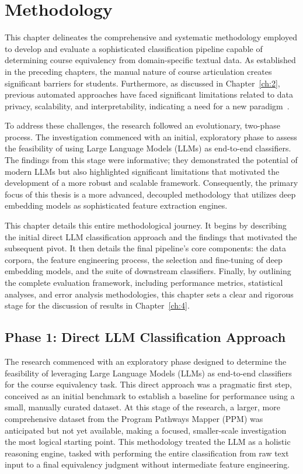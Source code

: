 \chapter{Methodology}\label{ch:3}
This chapter delineates the comprehensive and systematic methodology employed to develop and evaluate a sophisticated classification pipeline capable of determining course equivalency from domain-specific textual data. As established in the preceding chapters, the manual nature of course articulation creates significant barriers for students. Furthermore, as discussed in Chapter~\ref{ch:2}, previous automated approaches have faced significant limitations related to data privacy, scalability, and interpretability, indicating a need for a new paradigm~\cite{pardos-articulation-2019, slade10.1177/0002764213479366}.

To address these challenges, the research followed an evolutionary, two-phase process. The investigation commenced with an initial, exploratory phase to assess the feasibility of using Large Language Models (LLMs) as end-to-end classifiers. The findings from this stage were informative; they demonstrated the potential of modern LLMs but also highlighted significant limitations that motivated the development of a more robust and scalable framework. Consequently, the primary focus of this thesis is a more advanced, decoupled methodology that utilizes deep embedding models as sophisticated feature extraction engines.

This chapter details this entire methodological journey. It begins by describing the initial direct LLM classification approach and the findings that motivated the subsequent pivot. It then details the final pipeline's core components: the data corpora, the feature engineering process, the selection and fine-tuning of deep embedding models, and the suite of downstream classifiers. Finally, by outlining the complete evaluation framework, including performance metrics, statistical analyses, and error analysis methodologies, this chapter sets a clear and rigorous stage for the discussion of results in Chapter~\ref{ch:4}.

\section{Phase 1: Direct LLM Classification Approach}\label{ch:3.1}
The research commenced with an exploratory phase designed to determine the feasibility of leveraging Large Language Models (LLMs) as end-to-end classifiers for the course equivalency task. This direct approach was a pragmatic first step, conceived as an initial benchmark to establish a baseline for performance using a small, manually curated dataset. At this stage of the research, a larger, more comprehensive dataset from the Program Pathways Mapper (PPM) was anticipated but not yet available, making a focused, smaller-scale investigation the most logical starting point. This methodology treated the LLM as a holistic reasoning engine, tasked with performing the entire classification from raw text input to a final equivalency judgment without intermediate feature engineering.

